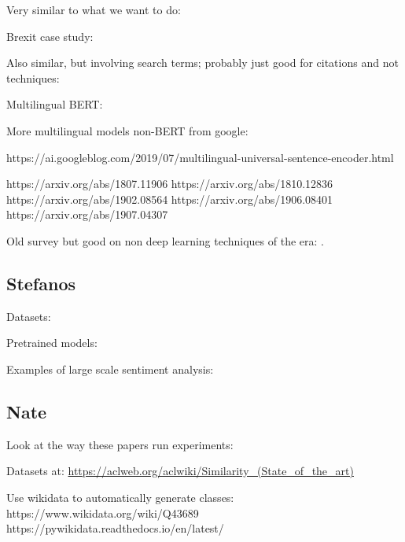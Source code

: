 \documentclass[11pt]{article}
\begin{document}
Very similar to what we want to do: \cite{rupnik2016news,miranda2018multilingual,wang2018estimation,germann2019scalable,seki2018exploring,seki2020cross,linger2020batch}

Brexit case study: \cite{peterlin2019detecting}

Also similar, but involving search terms; probably just good for citations and not techniques: \cite{rupnik2016news}

Multilingual BERT:

\cite{K2020Cross-Lingual}

\cite{pires2019multilingual}

More multilingual models non-BERT from google:

https://ai.googleblog.com/2019/07/multilingual-universal-sentence-encoder.html

https://arxiv.org/abs/1807.11906
https://arxiv.org/abs/1810.12836
https://arxiv.org/abs/1902.08564
https://arxiv.org/abs/1906.08401
https://arxiv.org/abs/1907.04307

Old survey but good on non deep learning techniques of the era: \cite{oard1998survey}.

\subsection{Stefanos}

Datasets:

\cite{liu2019dens}

\cite{SemEval2018Task1}

Pretrained models:

\cite{puri2018large}

\cite{kant2018practical}

Examples of large scale sentiment analysis:

\cite{mohammad2015sentiment}

\cite{hemmatian2017survey}

\cite{yang2015twitter}

\subsection{Nate}

Look at the way these papers run experiments:

\cite{tifrea2018poincar,meng2019spherical}

Datasets at: \url{https://aclweb.org/aclwiki/Similarity_(State_of_the_art)}

Use wikidata to automatically generate classes: https://www.wikidata.org/wiki/Q43689 
https://pywikidata.readthedocs.io/en/latest/
\end{document}
